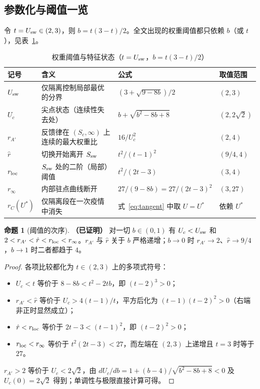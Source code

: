 \documentclass[11pt,a4paper]{ctexart}
\theoremstyle{definition}
\newtheorem{proposition}[theorem]{命题}
\theoremstyle{definition}
\newcommand{\Usw}{U_{\rm sw}}
\newcommand{\Ssw}{S_{\rm sw}}
\newcommand{\rA}{r_{A'}}
\newcommand{\rhat}{\hat r}
\newcommand{\rloc}{r_{\rm loc}}
\newcommand{\rinf}{r_{\infty}}
\newcommand{\proven}{\textbf{（已证明）}}
\begin{document}
\subsection{参数化与阈值一览}
令 $t=\Usw\in(2,3)$，则 $b=t(3-t)/2$。全文出现的权重阈值都只依赖 $b$（或 $t$），见表~\ref{tab:thr-formula}。

\begin{table}[htbp]\centering\small
\caption{权重阈值与特征状态（$t=\Usw$，$b=t(3-t)/2$）}\label{tab:thr-formula}
\begin{tabular}{@{}llll@{}}\toprule
记号 & 含义 & 公式 & 取值范围\\\midrule
$\Usw$ & 仅隔离控制局部最优的分界 & $(3+\sqrt{9-8b})/2$ & $(2,3)$\\
$U_c$ & 尖点状态（连续性失去处） & $b+\sqrt{b^2-8b+8}$ & $(2,2\sqrt2)$\\
$\rA$ & 反馈律在 $(S_c,\infty)$ 上连续的最大权重比 & $16/U_c^2$ & $(2,4)$\\
$\rhat$ & 切换开始离开 $\Ssw$ & $t^2/(t-1)^2$ & $(9/4,4)$\\
$\rloc$ & $\Ssw$ 处的二阶（局部）阈值 & $t^2/(2t-3)$ & $(3,4)$\\
$\rinf$ & 内部驻点曲线断开 & $27/(9-8b)=27/(2t-3)^2$ & $(3,27)$\\
$r_C(U^*)$ & 仅隔离段在一次疫情中消失 & 式~\eqref{eq:tangent} 中取 $U=U^*$ & 依赖 $U^*$\\\bottomrule
\end{tabular}
\end{table}

\begin{proposition}[阈值的次序]\label{prop:order}\proven
对一切 $b\in(0,1)$ 有 $U_c<\Usw$ 和 $2<\rA<\rhat<\rloc<\rinf$。$\rA$ 与 $\rhat$ 关于 $b$ 严格递增；$b\to0$ 时 $\rA\to2$、$\rhat\to9/4$，$b\to1$ 时二者都趋于 $4$。
\end{proposition}
\begin{proof}
各项比较都化为 $t\in(2,3)$ 上的多项式符号：
\begin{itemize}
\item $U_c<t$ 等价于 $8-8b<t^2-2tb$，即 $(t-2)^3>0$；
\item $\rA<\rhat$ 等价于 $U_c>4(t-1)/t$，平方后化为 $(t-1)(t-2)^2>0$（右端非正时显然成立）；
\item $\rhat<\rloc$ 等价于 $2t-3<(t-1)^2$，即 $(t-2)^2>0$；
\item $\rloc<\rinf$ 等价于 $t^2(2t-3)<27$，而左端在 $(2,3)$ 上递增且 $t=3$ 时等于 $27$。
\end{itemize}
$\rA>2$ 等价于 $U_c<2\sqrt2$，由 $dU_c/db=1+(b-4)/\sqrt{b^2-8b+8}<0$ 及 $U_c(0)=2\sqrt2$ 得到；单调性与极限直接计算可得。
\end{proof}
\end{document}
